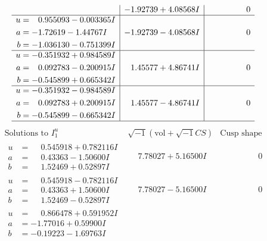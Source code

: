 \documentclass[1p]{elsarticle_modified}
\theoremstyle{definition}
\newcommand{\I}{\sqrt{-1}}
\begin{document}
$$\begin{array}{c|c|c}
 & -1.92739 + 4.08568 I & \phantom{-0.000000 } 0 \\ \hline\begin{aligned}
u &= \phantom{-}0.955093 - 0.003365 I \\
a &= -1.72619 - 1.44767 I \\
b &= -1.036130 - 0.751399 I\end{aligned}
 & -1.92739 - 4.08568 I & \phantom{-0.000000 } 0 \\ \hline\begin{aligned}
u &= -0.351932 + 0.984589 I \\
a &= \phantom{-}0.092783 - 0.200915 I \\
b &= -0.545899 + 0.665342 I\end{aligned}
 & \phantom{-}1.45577 + 4.86741 I & \phantom{-0.000000 } 0 \\ \hline\begin{aligned}
u &= -0.351932 - 0.984589 I \\
a &= \phantom{-}0.092783 + 0.200915 I \\
b &= -0.545899 - 0.665342 I\end{aligned}
 & \phantom{-}1.45577 - 4.86741 I & \phantom{-0.000000 } 0\\
 \hline 
 \end{array}$$\newpage$$\begin{array}{c|c|c}  
\text{Solutions to }I^u_{1}& \I (\text{vol} + \sqrt{-1}CS) & \text{Cusp shape}\\
 \hline 
\begin{aligned}
u &= \phantom{-}0.545918 + 0.782116 I \\
a &= \phantom{-}0.43363 - 1.50600 I \\
b &= \phantom{-}1.52469 + 0.52897 I\end{aligned}
 & \phantom{-}7.78027 + 5.16500 I & \phantom{-0.000000 } 0 \\ \hline\begin{aligned}
u &= \phantom{-}0.545918 - 0.782116 I \\
a &= \phantom{-}0.43363 + 1.50600 I \\
b &= \phantom{-}1.52469 - 0.52897 I\end{aligned}
 & \phantom{-}7.78027 - 5.16500 I & \phantom{-0.000000 } 0 \\ \hline\begin{aligned}
u &= \phantom{-}0.866478 + 0.591952 I \\
a &= -1.77016 + 0.59900 I \\
b &= -0.19223 - 1.69763 I\end{aligned}

\end{array}$$
\end{document}
